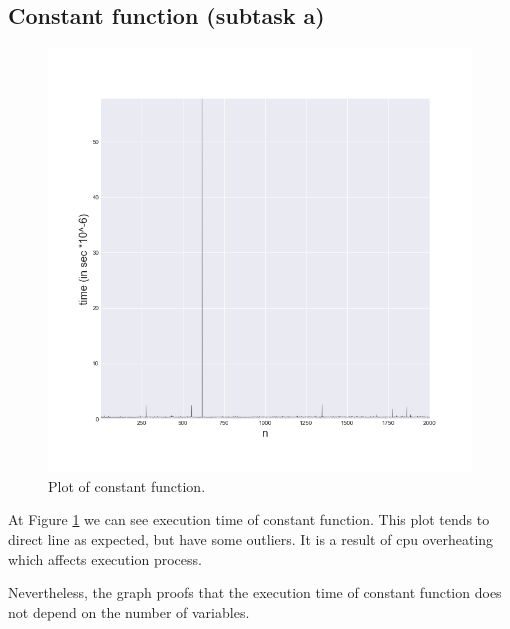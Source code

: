 \documentclass[a4paper,article,14pt]{extarticle}
\begin{document}
	\subsection{Constant function (subtask a)}
	\begin{figure}[h]
		\centering
		\includegraphics[scale=0.5]{constant.png}
		\caption{Plot of constant function.}
		\label{constant}
	\end{figure} 
	At Figure \ref{constant} we can see execution time of constant function. This plot tends to direct line as expected, but have some outliers. It is a result of cpu overheating which affects execution process.
	
	Nevertheless, the graph proofs that the execution time of constant function does not depend on the number of variables.
	
\end{document}

